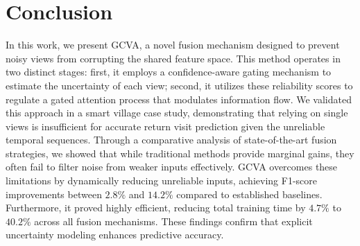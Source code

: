\documentclass[journal]{IEEEtran}
\begin{document}
\section{Conclusion} \label{sec:conclusion}

In this work, we present GCVA, a novel fusion mechanism designed to prevent noisy views from corrupting the shared feature space. This method operates in two distinct stages: first, it employs a confidence-aware gating mechanism to estimate the uncertainty of each view; second, it utilizes these reliability scores to regulate a gated attention process that modulates information flow. We validated this approach in a smart village case study, demonstrating that relying on single views is insufficient for accurate return visit prediction given the unreliable temporal sequences. Through a comparative analysis of state-of-the-art fusion strategies, we showed that while traditional methods provide marginal gains, they often fail to filter noise from weaker inputs effectively. GCVA overcomes these limitations by dynamically reducing unreliable inputs, achieving F1-score improvements between $2.8\%$ and $14.2\%$ compared to established baselines. Furthermore, it proved highly efficient, reducing total training time by $4.7\%$ to $40.2\%$ across all fusion mechanisms. These findings confirm that explicit uncertainty modeling enhances predictive accuracy.




%
\end{document}
